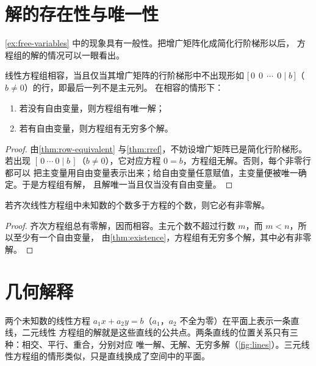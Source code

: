\section{解的存在性与唯一性}\label{sec:existence}

\cref{ex:free-variables} 中的现象具有一般性。把增广矩阵化成简化行阶梯形以后，
方程组的解的情况可以一眼看出。

\begin{theorem}\label{thm:existence}
线性方程组相容，当且仅当其增广矩阵的行阶梯形中不出现形如
$\bigl[\,0\ \ 0\ \ \cdots\ \ 0\mid b\,\bigr]$（$b\ne0$）的行，即最后一列不是主元列。
在相容的情形下：
\begin{enumerate}
  \item 若没有自由变量，则方程组有唯一解；
  \item 若有自由变量，则方程组有无穷多个解。
\end{enumerate}
\end{theorem}

\begin{proof}
由\cref{thm:row-equivalent} 与\cref{thm:rref}，不妨设增广矩阵已是简化行阶梯形。若出现
$[\,0\ \cdots\ 0\mid b\,]$（$b\ne0$），它对应方程 $0=b$，方程组无解。否则，每个非零行都可以
把主变量用自由变量表示出来；给自由变量任意赋值，主变量便被唯一确定。于是方程组有解，
且解唯一当且仅当没有自由变量。
\end{proof}

\begin{corollary}\label{cor:homogeneous}
若齐次线性方程组中未知数的个数多于方程的个数，则它必有非零解。
\end{corollary}

\begin{proof}
齐次方程组总有零解，因而相容。主元个数不超过行数 $m$，而 $m<n$，所以至少有一个自由变量，
由\cref{thm:existence}，方程组有无穷多个解，其中必有非零解。
\end{proof}

\section{几何解释}\label{sec:geometry}

两个未知数的线性方程 $a_1x+a_2y=b$（$a_1$，$a_2$ 不全为零）在平面上表示一条直线，二元线性
方程组的解就是这些直线的公共点。两条直线的位置关系只有三种：相交、平行、重合，分别对应
唯一解、无解、无穷多解（\cref{fig:lines}）。三元线性方程组的情形类似，只是直线换成了空间中的平面。

